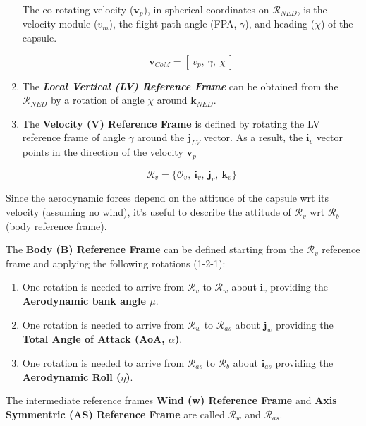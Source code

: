\begin{enumerate}
         The co-rotating velocity ($\textbf{v}_{p}$), in spherical coordinates on $\mathcal{R}_{NED}$, is the velocity module ($v_{m}$), 
         the flight path angle (FPA, $\gamma$), and heading ($\chi$) of the capsule.
      
         $$
            \textbf{v}_{CoM} = [\: v_{p},\:\gamma,\:\chi \:]
         $$

      \item The \textbf{\textit{Local Vertical (LV) Reference Frame}} can be obtained from
         the $\mathcal{R}_{NED}$ by a rotation of angle $\chi$ around $\textbf{k}_{NED}$.

      \item The \textbf{Velocity (V) Reference Frame} is defined by rotating the LV reference frame
         of angle $\gamma$ around the $\textbf{j}_{LV}$ vector. As a result, the $\textbf{i}_{v}$ vector points
         in the direction of the velocity $\textbf{v}_{p}$

         $$\mathcal{R}_{v}=\{ \mathcal{O}_{v},\: \textbf{i}_{v},\:\textbf{j}_{v},\: \textbf{k}_{v} \}$$
   \end{enumerate}

   \vspace{0.5cm}

   Since the aerodynamic forces depend on the attitude of the capsule wrt its velocity (assuming no wind), it's
   useful to describe the attitude of $\mathcal{R}_{v}$ wrt $\mathcal{R}_{b}$ (body reference frame).

   The \textbf{Body (B) Reference Frame} can be defined starting from the $\mathcal{R}_{v}$ reference frame and
   applying the following rotations (1-2-1):

   \begin{enumerate}
      \item One rotation is needed to arrive from $\mathcal{R}_v$ to $\mathcal{R}_w$ about $\textbf{i}_v$ providing
         the \textbf{Aerodynamic bank angle $\mu$}.
      \item One rotation is needed to arrive from $\mathcal{R}_w$ to $\mathcal{R}_{as}$ about $\textbf{j}_w$ providing
         the \textbf{Total Angle of Attack (AoA, $\alpha$)}.
      \item One rotation is needed to arrive from $\mathcal{R}_{as}$ to $\mathcal{R}_{b}$ about $\textbf{i}_{as}$ providing
         the \textbf{Aerodynamic Roll ($\eta$)}.
   \end{enumerate}

   The intermediate reference frames \textbf{Wind (w) Reference Frame} and \textbf{Axis Symmentric (AS) Reference Frame} are called
   $\mathcal{R}_w$ and $\mathcal{R}_{as}$.

